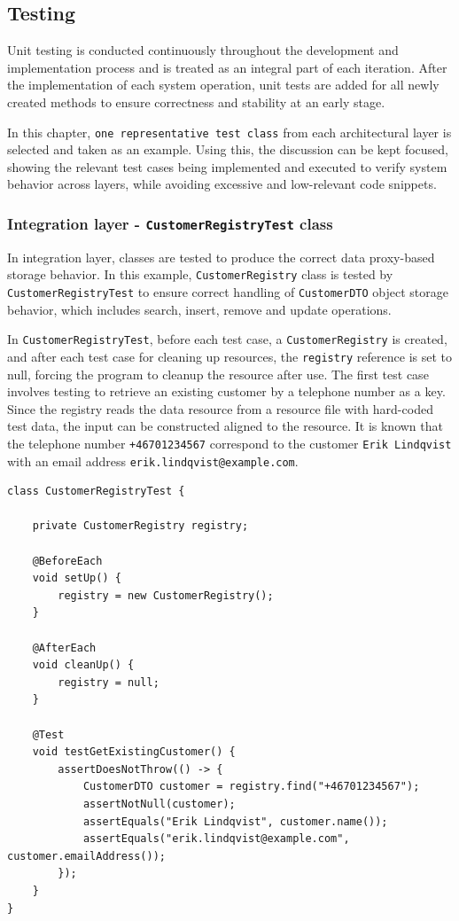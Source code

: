 \documentclass[a4paper]{scrartcl}
\begin{document}
\subsection{Testing}

Unit testing is conducted continuously throughout the development and implementation process and is treated as an integral part of each iteration. After the implementation of each system operation, unit tests are added for all newly created methods to ensure correctness and stability at an early stage.

In this chapter, \texttt{one representative test class} from each architectural layer is selected and taken as an example. Using this, the discussion can be kept focused, showing the relevant test cases being implemented and executed to verify system behavior across layers, while avoiding excessive and low-relevant code snippets.

\subsubsection{Integration layer - \texttt{CustomerRegistryTest} class}

In integration layer, classes are tested to produce the correct data proxy-based storage behavior. In this example, \texttt{CustomerRegistry} class is tested by \texttt{CustomerRegistryTest} to ensure correct handling of \texttt{CustomerDTO} object storage behavior, which includes search, insert, remove and update operations.

In \texttt{CustomerRegistryTest}, before each test case, a \texttt{CustomerRegistry} is created, and after each test case for cleaning up resources, the \texttt{registry} reference is set to null, forcing the program to cleanup the resource after use. The first test case involves testing to retrieve an existing customer by a telephone number as a key. Since the registry reads the data resource from a resource file with hard-coded test data, the input can be constructed aligned to the resource. It is known that the telephone number \texttt{+46701234567} correspond to the customer \texttt{Erik Lindqvist} with an email address \texttt{erik.lindqvist@example.com}.

\begin{lstlisting}[style=javastyle, caption={Basic test case in \texttt{CustomerRegistryTest}}]
class CustomerRegistryTest {

    private CustomerRegistry registry;

    @BeforeEach
    void setUp() {
        registry = new CustomerRegistry();
    }

    @AfterEach
    void cleanUp() {
        registry = null;
    }

    @Test
    void testGetExistingCustomer() {
        assertDoesNotThrow(() -> {
            CustomerDTO customer = registry.find("+46701234567");
            assertNotNull(customer);
            assertEquals("Erik Lindqvist", customer.name());
            assertEquals("erik.lindqvist@example.com", customer.emailAddress());
        });
    }
}
\end{lstlisting}
\end{document}
